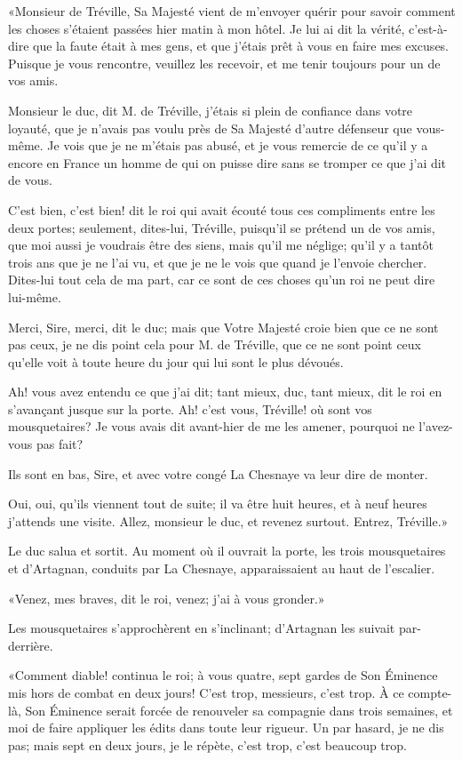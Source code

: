 «Monsieur de Tréville, Sa Majesté vient de m'envoyer quérir pour savoir comment les choses s'étaient passées hier matin à mon hôtel. Je lui ai dit la vérité, c'est-à-dire que la faute était à mes gens, et que j'étais prêt à vous en faire mes excuses. Puisque je vous rencontre, veuillez les recevoir, et me tenir toujours pour un de vos amis. 

\speak  Monsieur le duc, dit M. de Tréville, j'étais si plein de confiance dans votre loyauté, que je n'avais pas voulu près de Sa Majesté d'autre défenseur que vous-même. Je vois que je ne m'étais pas abusé, et je vous remercie de ce qu'il y a encore en France un homme de qui on puisse dire sans se tromper ce que j'ai dit de vous. 

\speak  C'est bien, c'est bien! dit le roi qui avait écouté tous ces compliments entre les deux portes; seulement, dites-lui, Tréville, puisqu'il se prétend un de vos amis, que moi aussi je voudrais être des siens, mais qu'il me néglige; qu'il y a tantôt trois ans que je ne l'ai vu, et que je ne le vois que quand je l'envoie chercher. Dites-lui tout cela de ma part, car ce sont de ces choses qu'un roi ne peut dire lui-même. 

\speak  Merci, Sire, merci, dit le duc; mais que Votre Majesté croie bien que ce ne sont pas ceux, je ne dis point cela pour M. de Tréville, que ce ne sont point ceux qu'elle voit à toute heure du jour qui lui sont le plus dévoués. 

\speak  Ah! vous avez entendu ce que j'ai dit; tant mieux, duc, tant mieux, dit le roi en s'avançant jusque sur la porte. Ah! c'est vous, Tréville! où sont vos mousquetaires? Je vous avais dit avant-hier de me les amener, pourquoi ne l'avez-vous pas fait? 

\speak  Ils sont en bas, Sire, et avec votre congé La Chesnaye va leur dire de monter. 

\speak  Oui, oui, qu'ils viennent tout de suite; il va être huit heures, et à neuf heures j'attends une visite. Allez, monsieur le duc, et revenez surtout. Entrez, Tréville.» 

Le duc salua et sortit. Au moment où il ouvrait la porte, les trois mousquetaires et d'Artagnan, conduits par La Chesnaye, apparaissaient au haut de l'escalier. 

«Venez, mes braves, dit le roi, venez; j'ai à vous gronder.» 

Les mousquetaires s'approchèrent en s'inclinant; d'Artagnan les suivait par-derrière. 

«Comment diable! continua le roi; à vous quatre, sept gardes de Son Éminence mis hors de combat en deux jours! C'est trop, messieurs, c'est trop. À ce compte-là, Son Éminence serait forcée de renouveler sa compagnie dans trois semaines, et moi de faire appliquer les édits dans toute leur rigueur. Un par hasard, je ne dis pas; mais sept en deux jours, je le répète, c'est trop, c'est beaucoup trop. 


